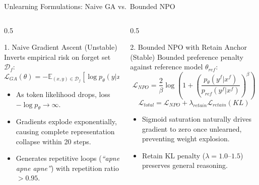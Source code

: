 \documentclass[aspectratio=169,10pt]{beamer}
\begin{document}
\begin{frame}{Unlearning Formulations: Naive GA vs.\ Bounded NPO}
  \begin{columns}[T]
    \begin{column}{0.5\textwidth}
      \begin{block}{1. Naive Gradient Ascent (Unstable)}
        \scriptsize Inverts empirical risk on forget set $\mathcal{D}_f$:
        $$\mathcal{L}_{GA}(\theta) = - \mathbb{E}_{(x, y) \in \mathcal{D}_f} \left[ \log p_\theta(y | x) \right]$$
        \begin{itemize}\scriptsize
          \item As token likelihood drops, loss $-\log p_\theta \to \infty$.
          \item Gradients explode exponentially, causing complete representation collapse within 20 steps.
          \item Generates repetitive loops (\emph{``apne apne apne''}) with repetition ratio $> 0.95$.
        \end{itemize}
      \end{block}
    \end{column}
    \begin{column}{0.5\textwidth}
      \begin{exampleblock}{2. Bounded NPO with Retain Anchor (Stable)}
        \scriptsize Bounded preference penalty against reference model $\theta_{ref}$:
        $$\mathcal{L}_{NPO} = \frac{2}{\beta} \log \left( 1 + \left( \frac{p_\theta(y^f|x^f)}{p_{ref}(y^f|x^f)} \right)^\beta \right)$$
        $$\mathcal{L}_{total} = \mathcal{L}_{NPO} + \lambda_{retain} \mathcal{L}_{retain}(KL)$$
        \begin{itemize}\scriptsize
          \item Sigmoid saturation naturally drives gradient to zero once unlearned, preventing weight explosion.
          \item Retain KL penalty ($\lambda = 1.0$--$1.5$) preserves general reasoning.
        \end{itemize}
      \end{exampleblock}
    \end{column}
  \end{columns}
\end{frame}
\end{document}
